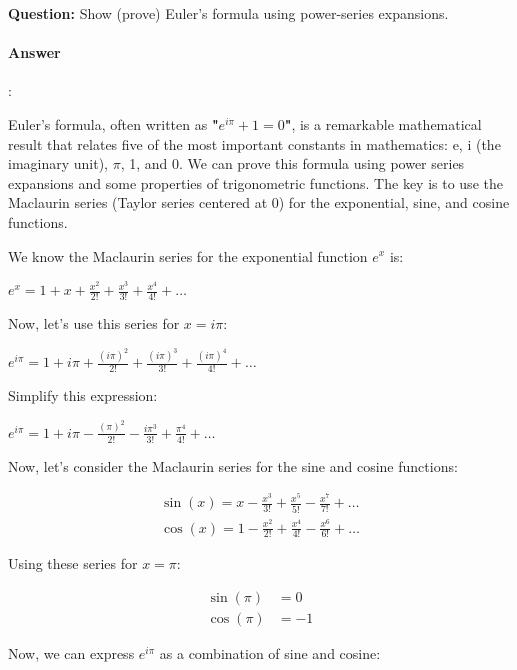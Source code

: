 \documentclass{article}
\begin{document}
\begin{tcolorbox}
  \textbf{Question:} Show (prove) Euler's formula using power-series expansions.
\end{tcolorbox}


\paragraph{Answer}:

Euler's formula, often written as \textbf{ "$e^{i \pi} + 1 = 0$"}, is a remarkable mathematical result that relates five of the most important constants in mathematics: e, i (the imaginary unit), $\pi$, 1, and 0. We can prove this formula using power series expansions and some properties of trigonometric functions. The key is to use the Maclaurin series (Taylor series centered at 0) for the exponential, sine, and cosine functions.

We know the Maclaurin series for the exponential function $e^x$ is:

$e^x = 1 + x + \frac{x^2}{2!} + \frac{x^3}{3!}  + \frac{x^4}{4!}  + \ldots $

Now, let's use this series for $x = i\pi$:

$e^{i\pi} = 1 + i\pi + \frac{(i\pi)^2}{2!} + \frac{(i\pi)^3}{3!} + \frac{(i\pi)^4}{4!}  + \ldots$

Simplify this expression:

$e^{i\pi} = 1 + i\pi - \frac{(\pi)^2}{2!}  - \frac{i\pi^3}{3!} + \frac{\pi^4}{4!}  + \ldots$

Now, let's consider the Maclaurin series for the sine and cosine functions:

\begin{equation*}
  \begin{aligned}
    \sin(x) = x - \frac{x^3}{3!} + \frac{x^5}{5!} - \frac{x^7}{7!} + \ldots \\
    \cos(x) = 1 - \frac{x^2}{2!} + \frac{x^4}{4!} - \frac{x^6}{6!} + \ldots  
  \end{aligned}
\end{equation*}

Using these series for $x = \pi$:

\begin{equation*}
  \begin{aligned}
    \sin(\pi) &= 0 \\
    \cos(\pi) &= -1
  \end{aligned}
\end{equation*}

Now, we can express $e^{i\pi}$ as a combination of sine and cosine:
\end{document}
